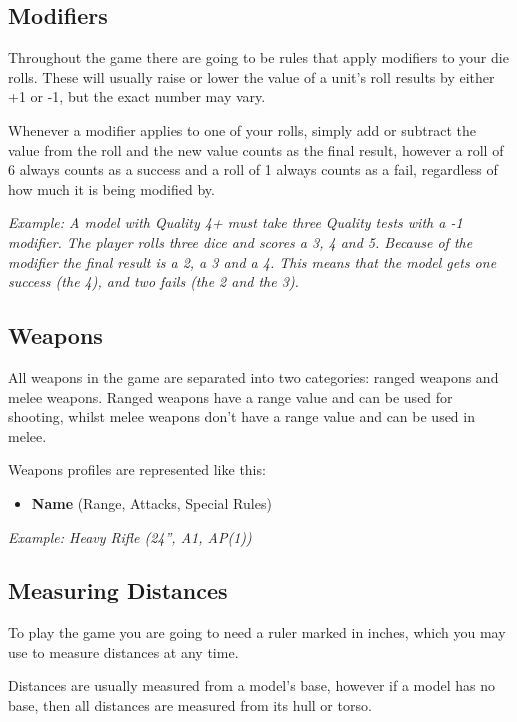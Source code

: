 \documentclass[9pt, a4paper]{extarticle}            %
\begin{document}
\vspace*{0.2cm}

\begin{multicols*}{2}

\subsection{Modifiers}

Throughout the game there are going to be rules that apply modifiers to your die rolls. These will usually raise or lower the value of a unit’s roll results by either +1 or -1, but the exact number may vary.

Whenever a modifier applies to one of your rolls, simply add or subtract the value from the roll and the new value counts as the final result, however a roll of 6 always counts as a success and a roll of 1 always counts as a fail, regardless of how much it is being modified by.

\textit{Example: A model with Quality 4+ must take three Quality tests with a -1 modifier. The player rolls three dice and scores a 3, 4 and 5. Because of the modifier the final result is a 2, a 3 and a 4. This means that the model gets one success (the 4), and two fails (the 2 and the 3).}

\subsection{Weapons}

All weapons in the game are separated into two categories: ranged weapons and melee weapons. Ranged weapons have a range value and can be used for shooting, whilst melee weapons don’t have a range value and can be used in melee.

Weapons profiles are represented like this:
\begin{itemize}
  \item \textbf{Name} (Range, Attacks, Special Rules)
\end{itemize}

\textit{Example: Heavy Rifle (24”, A1, AP(1))}

\subsection{Measuring Distances}

To play the game you are going to need a ruler marked in inches, which you may use to measure distances at any time.

Distances are usually measured from a model’s base, however if a model has no base, then all distances are measured from its hull or torso.


\end{multicols*}
\end{document}
